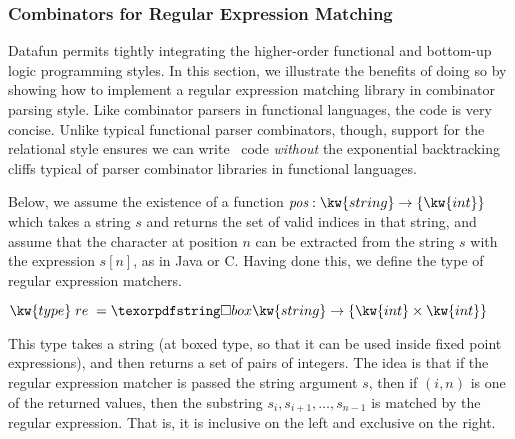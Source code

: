 \subsubsection{Combinators for Regular Expression Matching}

Datafun permits tightly integrating the higher-order functional and
bottom-up logic programming styles. In this section, we illustrate the
benefits of doing so by showing how to implement a regular expression
matching library in combinator parsing style.  Like combinator parsers
in functional languages, the code is very concise.  Unlike typical
functional parser combinators, though, support for the relational
style ensures we can write \naive\ code \emph{without} the exponential
backtracking cliffs typical of parser combinator libraries in
functional languages.

Below, we assume the existence of a function
$\name{pos} : \kw{string} \to \tset{\kw{int}}$ which takes a string
$s$ and returns the set of valid indices in that string, and assume
that the character at position $n$ can be extracted from the string
$s$ with the expression $s[n]$, as in Java or C. Having done this, we define
the type of regular expression matchers.
\begin{tabbing} 
\qquad  $\kw{type}\;re\;=\iso \kw{string} \to \tset{\kw{int} \times \kw{int}}$  
\end{tabbing}
This type takes a string (at boxed type, so that it can be used inside
fixed point expressions), and then returns a set of pairs of integers. The
idea is that if the regular expression matcher is passed the string
argument $s$, then if $(i, n)$ is one of the returned values, then the
substring $s_i, s_{i+1}, \ldots, s_{n-1}$ is matched by the regular expression.
That is, it is inclusive on the left and exclusive on the right. 

